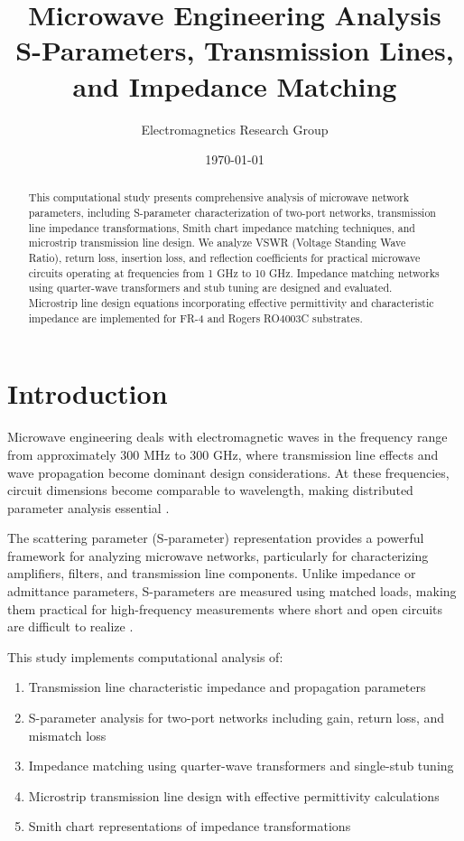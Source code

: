 \documentclass[11pt,a4paper]{article}
\title{Microwave Engineering Analysis\\S-Parameters, Transmission Lines, and Impedance Matching}
\author{Electromagnetics Research Group}
\date{\today}
\begin{document}
\maketitle

\begin{abstract}
This computational study presents comprehensive analysis of microwave network parameters, including S-parameter characterization of two-port networks, transmission line impedance transformations, Smith chart impedance matching techniques, and microstrip transmission line design. We analyze VSWR (Voltage Standing Wave Ratio), return loss, insertion loss, and reflection coefficients for practical microwave circuits operating at frequencies from 1 GHz to 10 GHz. Impedance matching networks using quarter-wave transformers and stub tuning are designed and evaluated. Microstrip line design equations incorporating effective permittivity and characteristic impedance are implemented for FR-4 and Rogers RO4003C substrates.
\end{abstract}

\section{Introduction}

Microwave engineering deals with electromagnetic waves in the frequency range from approximately 300 MHz to 300 GHz, where transmission line effects and wave propagation become dominant design considerations. At these frequencies, circuit dimensions become comparable to wavelength, making distributed parameter analysis essential \cite{Pozar2012,Collin2001}.

The scattering parameter (S-parameter) representation provides a powerful framework for analyzing microwave networks, particularly for characterizing amplifiers, filters, and transmission line components. Unlike impedance or admittance parameters, S-parameters are measured using matched loads, making them practical for high-frequency measurements where short and open circuits are difficult to realize \cite{Gonzalez1997}.

This study implements computational analysis of:
\begin{enumerate}
\item Transmission line characteristic impedance and propagation parameters
\item S-parameter analysis for two-port networks including gain, return loss, and mismatch loss
\item Impedance matching using quarter-wave transformers and single-stub tuning
\item Microstrip transmission line design with effective permittivity calculations
\item Smith chart representations of impedance transformations
\end{enumerate}
\end{document}
